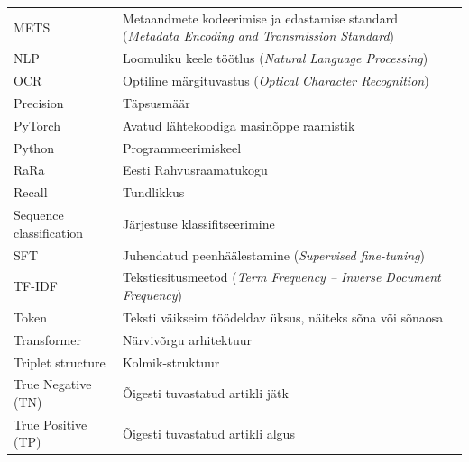 \begin{longtable}{p{3cm}p{10cm}}
METS&Metaandmete kodeerimise ja edastamise standard (\textit{Metadata Encoding and Transmission Standard})\\
NLP&Loomuliku keele töötlus (\textit{Natural Language Processing})\\
OCR&Optiline märgituvastus (\textit{Optical Character Recognition})\\
Precision&Täpsusmäär\\
PyTorch&Avatud lähtekoodiga masinõppe raamistik\\
Python&Programmeerimiskeel\\
RaRa&Eesti Rahvusraamatukogu\\
Recall&Tundlikkus\\
Sequence classification&Järjestuse klassifitseerimine\\
SFT&Juhendatud peenhäälestamine (\textit{Supervised fine-tuning})\\
TF-IDF&Tekstiesitusmeetod (\textit{Term Frequency -- Inverse Document Frequency})\\
Token&Teksti väikseim töödeldav üksus, näiteks sõna või sõnaosa\\
Transformer&Närvivõrgu arhitektuur\\
Triplet structure&Kolmik-struktuur\\
True Negative (TN)&Õigesti tuvastatud artikli jätk\\
True Positive (TP)&Õigesti tuvastatud artikli algus\\
\end{longtable}
\addtocounter{table}{-1} %